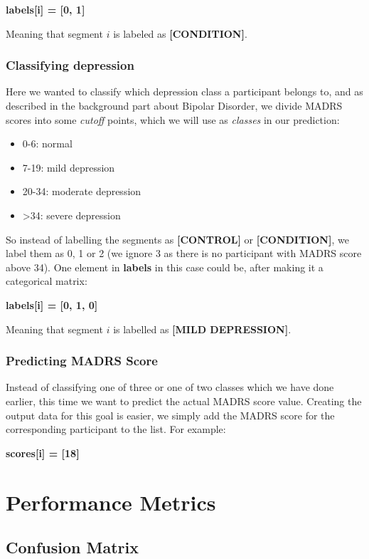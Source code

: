 \textbf{labels[i] = [0, 1]}

\noindent Meaning that segment $i$ is labeled as \textbf{[CONDITION]}.

\subsubsection{Classifying depression}
Here we wanted to classify which depression class a participant belongs to, and as described in the background part about Bipolar Disorder, 
we divide MADRS scores into some \textit{cutoff} points, which we will use as \textit{classes} in our prediction:

\begin{itemize}
  \item 0-6: normal
  \item 7-19: mild depression
  \item 20-34: moderate depression
  \item >34: severe depression
\end{itemize}

So instead of labelling the segments as \textbf{[CONTROL]} or \textbf{[CONDITION]}, we label them as 0, 1 or 2 (we ignore 3 as there is no participant with 
MADRS score above 34). One element in \textbf{labels} in this case could be, after making it a categorical matrix:

\textbf{labels[i] = [0, 1, 0]}

\noindent Meaning that segment $i$ is labelled as \textbf{[MILD DEPRESSION]}.

\subsubsection{Predicting MADRS Score}

Instead of classifying one of three or one of two classes which we have done earlier, this time we want to predict the actual MADRS score value. 
Creating the output data for this goal is easier, we simply add the MADRS score for the corresponding participant to the list. For example:

\textbf{scores[i] = [18]}

\section{Performance Metrics}
\subsection{Confusion Matrix}


